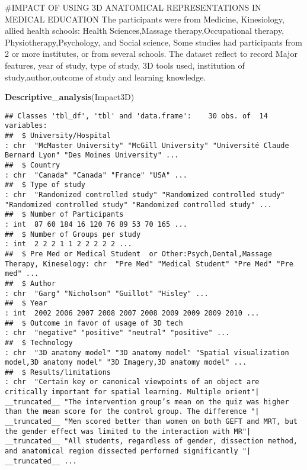 \documentclass[]{article}
\newenvironment{Shaded}{\begin{snugshade}}{\end{snugshade}}
\newcommand{\KeywordTok}[1]{\textcolor[rgb]{0.13,0.29,0.53}{\textbf{#1}}}
\newcommand{\NormalTok}[1]{#1}
\begin{document}
\#IMPACT OF USING 3D ANATOMICAL REPRESENTATIONS IN MEDICAL EDUCATION The
participants were from Medicine, Kinesiology, allied health schools:
Health Sciences,Massage therapy,Occupational therapy,
Physiotherapy,Psychology, and Social science, Some studies had
participants from 2 or more institutes, or from several schools. The
dataset reflect to record Major features, year of study, type of study,
3D tools used, institution of study,author,outcome of study and learning
knowledge.

\begin{Shaded}
\begin{Highlighting}[]
\KeywordTok{Descriptive_analysis}\NormalTok{(Impact3D)}
\end{Highlighting}
\end{Shaded}

\begin{verbatim}
## Classes 'tbl_df', 'tbl' and 'data.frame':    30 obs. of  14 variables:
##  $ University/Hospital                                                          : chr  "McMaster University" "McGill University" "Université Claude Bernard Lyon" "Des Moines University" ...
##  $ Country                                                                      : chr  "Canada" "Canada" "France" "USA" ...
##  $ Type of study                                                                : chr  "Randomized controlled study" "Randomized controlled study" "Randomized controlled study" "Randomized controlled study" ...
##  $ Number of Participants                                                       : int  87 60 184 16 120 76 89 53 70 165 ...
##  $ Number of Groups per study                                                   : int  2 2 2 1 1 2 2 2 2 2 ...
##  $ Pre Med or Medical Student  or Other:Psych,Dental,Massage Therapy, Kineselogy: chr  "Pre Med" "Medical Student" "Pre Med" "Pre med" ...
##  $ Author                                                                       : chr  "Garg" "Nicholson" "Guillot" "Hisley" ...
##  $ Year                                                                         : int  2002 2006 2007 2008 2007 2008 2009 2009 2009 2010 ...
##  $ Outcome in favor of usage of 3D tech                                         : chr  "negative" "positive" "neutral" "positive" ...
##  $ Technology                                                                   : chr  "3D anatomy model" "3D anatomy model" "Spatial visualization model,3D anatomy model" "3D Imagery,3D anatomy model" ...
##  $ Results/limitations                                                          : chr  "Certain key or canonical viewpoints of an object are critically important for spatial learning. Multiple orient"| __truncated__ "The intervention group’s mean on the quiz was higher than the mean score for the control group. The difference "| __truncated__ "Men scored better than women on both GEFT and MRT, but the gender effect was limited to the interaction with MR"| __truncated__ "All students, regardless of gender, dissection method, and anatomical region dissected performed significantly "| __truncated__ ...

\end{verbatim}
\end{document}
